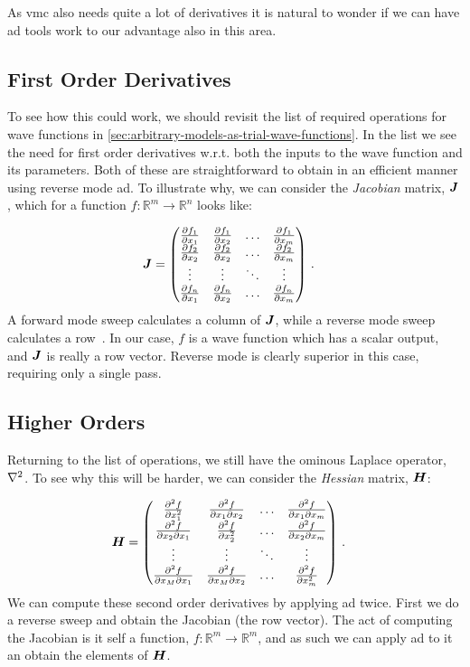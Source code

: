 \documentclass[Thesis.tex]{subfiles}
\begin{document}
As \gls{vmc} also needs quite a lot of derivatives it is natural to wonder if we
can have \gls{ad} tools work to our advantage also in this area.

\subsection{First Order Derivatives}

To see how this could work, we should revisit the list of required operations
for wave functions in \cref{sec:arbitrary-models-as-trial-wave-functions}. In
the list we see the need for first order derivatives w.r.t. both the inputs to
the wave function and its parameters. Both of these are straightforward to
obtain in an efficient manner using reverse mode \gls{ad}. To illustrate why, we can
consider the \emph{Jacobian} matrix, $\bm{J}$, which for a function
$f:\mathbb{R}^m\to\mathbb{R}^n$ looks like:

\begin{align}
  \bm{J} &=
  \begin{pmatrix}
    \pdv{f_1}{x_1} & \pdv{f_1}{x_2} & \dots & \pdv{f_1}{x_m}\\
    \pdv{f_2}{x_2} & \pdv{f_2}{x_2} & \dots & \pdv{f_2}{x_m}\\
    \vdots & \vdots & \ddots & \vdots\\
    \pdv{f_n}{x_1} & \pdv{f_n}{x_2} & \dots & \pdv{f_n}{x_m}\\
  \end{pmatrix}\,.
\end{align}
A forward mode sweep calculates a column of $\bm{J}$, while a reverse mode sweep
calculates a row~\cite{auto-diff-Berland}. In our case, $f$ is a wave function
which has a scalar output, and $\bm{J}$ is really a row vector. Reverse mode is
clearly superior in this case, requiring only a single pass.

\subsection{Higher Orders}

Returning to the list of operations, we still have the ominous Laplace
operator, $\laplacian$. To see why this will be harder, we can consider the
\emph{Hessian} matrix, $\bm{H}$:

\begin{align}
  \bm{H} &=
  \begin{pmatrix}
    \pdv[2]{f}{x_1} & \pdv{f}{x_1}{x_2} & \dots & \pdv{f}{x_1}{x_m}\\
    \pdv{f}{x_2}{x_1} & \pdv[2]{f}{x_2} & \dots & \pdv{f}{x_2}{x_m}\\
    \vdots & \vdots & \ddots & \vdots\\
    \pdv{f}{x_M}{x_1} & \pdv{f}{x_M}{x_2} & \dots & \pdv[2]{f}{x_m}\\
  \end{pmatrix}\,.
\end{align}
We can compute these second order derivatives by applying \gls{ad} twice. First we do
a reverse sweep and obtain the Jacobian (the row vector). The act of computing
the Jacobian is it self a function, $f: \mathbb{R}^m\to\mathbb{R}^m$, and as
such we can apply \gls{ad} to it an obtain the elements of $\bm{H}$.
\end{document}

